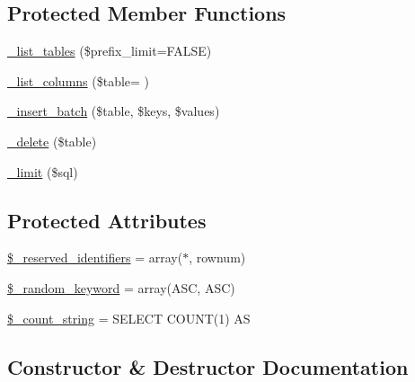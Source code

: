 \subsection*{Protected Member Functions}
\begin{DoxyCompactItemize}
\item 
\hyperlink{class_c_i___d_b__pdo__oci__driver_a435c0f3ce54fe7daa178baa8532ebd54}{\+\_\+list\+\_\+tables} (\$prefix\+\_\+limit=F\+A\+L\+S\+E)
\item 
\hyperlink{class_c_i___d_b__pdo__oci__driver_a2a81bb476a5c76fe6f763b0557c1e4c2}{\+\_\+list\+\_\+columns} (\$table= \textquotesingle{}\textquotesingle{})
\item 
\hyperlink{class_c_i___d_b__pdo__oci__driver_a1978e1358c812587a46e242630365099}{\+\_\+insert\+\_\+batch} (\$table, \$keys, \$values)
\item 
\hyperlink{class_c_i___d_b__pdo__oci__driver_a133ea8446ded52589bd22cc9163d0896}{\+\_\+delete} (\$table)
\item 
\hyperlink{class_c_i___d_b__pdo__oci__driver_a3a02ea06541b8ecc25a33a61651562c8}{\+\_\+limit} (\$sql)
\end{DoxyCompactItemize}
\subsection*{Protected Attributes}
\begin{DoxyCompactItemize}
\item 
\hyperlink{class_c_i___d_b__pdo__oci__driver_aa3298c4c62fbee8bb09f1b75b633fb0d}{\$\+\_\+reserved\+\_\+identifiers} = array(\textquotesingle{}$\ast$\textquotesingle{}, \textquotesingle{}rownum\textquotesingle{})
\item 
\hyperlink{class_c_i___d_b__pdo__oci__driver_a10213aa6e05f6d924d3277bb1d2fea00}{\$\+\_\+random\+\_\+keyword} = array(\textquotesingle{}A\+S\+C\textquotesingle{}, \textquotesingle{}A\+S\+C\textquotesingle{})
\item 
\hyperlink{class_c_i___d_b__pdo__oci__driver_a06c80bac2ecbd0557827e96949c23097}{\$\+\_\+count\+\_\+string} = \textquotesingle{}S\+E\+L\+E\+C\+T C\+O\+U\+N\+T(1) A\+S \textquotesingle{}
\end{DoxyCompactItemize}


\subsection{Constructor \& Destructor Documentation}
\hypertarget{class_c_i___d_b__pdo__oci__driver_a9162320adff1a1a4afd7f2372f753a3e}{}
